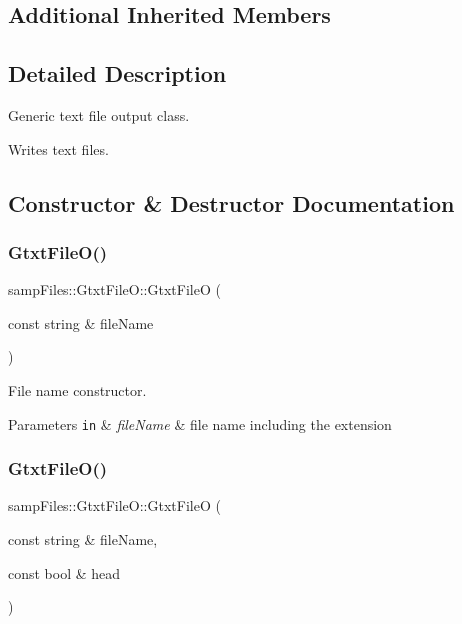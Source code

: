 \subsection*{Additional Inherited Members}


\subsection{Detailed Description}
Generic text file output class. 

Writes text files. 

\subsection{Constructor \& Destructor Documentation}
\mbox{\label{classsamp_files_1_1_gtxt_file_o_a3329b261b0364edfdc47842609271eb6}} 
\subsubsection{\texorpdfstring{Gtxt\+File\+O()}{GtxtFileO()}\hspace{0.1cm}{\footnotesize\ttfamily [1/2]}}
{\footnotesize\ttfamily samp\+Files\+::\+Gtxt\+File\+O\+::\+Gtxt\+FileO (\begin{DoxyParamCaption}\item[{const string \&}]{file\+Name }\end{DoxyParamCaption})\hspace{0.3cm}{\ttfamily [inline]}}



File name constructor. 


\begin{DoxyParams}[1]{Parameters}
\mbox{\tt in}  & {\em file\+Name} & file name including the extension \\
\hline
\end{DoxyParams}
\mbox{\label{classsamp_files_1_1_gtxt_file_o_a84944d8c2b0e6c6eeb877b53e17fc104}} 
\subsubsection{\texorpdfstring{Gtxt\+File\+O()}{GtxtFileO()}\hspace{0.1cm}{\footnotesize\ttfamily [2/2]}}
{\footnotesize\ttfamily samp\+Files\+::\+Gtxt\+File\+O\+::\+Gtxt\+FileO (\begin{DoxyParamCaption}\item[{const string \&}]{file\+Name,  }\item[{const bool \&}]{head }\end{DoxyParamCaption})\hspace{0.3cm}{\ttfamily [inline]}}



